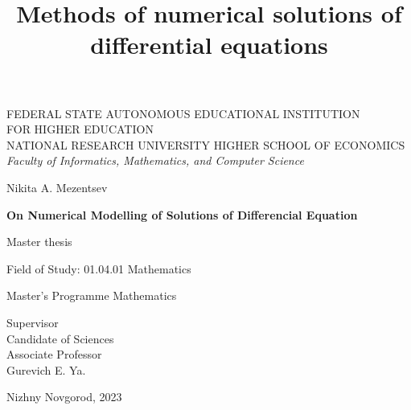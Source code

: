 \documentclass{article}
\title{Methods of numerical solutions of differential equations}
\date{}
\begin{document}
\large %
 \pagestyle{empty}
\begin{center}
{FEDERAL STATE AUTONOMOUS EDUCATIONAL INSTITUTION\\
FOR HIGHER EDUCATION\\
NATIONAL RESEARCH UNIVERSITY HIGHER SCHOOL OF ECONOMICS}\\
{\textit {Faculty of Informatics, Mathematics, and Computer Science}}\\
\end{center}
\vspace{30mm}
\begin{center}
{\Large Nikita A. Mezentsev}
\end{center}
\begin{center}
{\Large \bf On Numerical Modelling of Solutions of Differencial Equation}
\end{center}

\begin{center}
{\Large Master thesis}
\end{center}
\begin {center}
{\Large Field of Study: 01.04.01 Mathematics}
\end{center}
\begin{center}
{\Large Master's Programme Mathematics}
\end{center}

\vspace{10mm}
\begin{center}
\end{center}


\vspace{5mm}

\begin{flushright}
{\Large               Supervisor\\ Candidate of Sciences\\
Associate Professor\\ Gurevich E. Ya.}\\
\end{flushright}

\vspace{90mm}
\begin{center}
Nizhny Novgorod, 2023
\end{center}

\pagebreak

\renewcommand\contentsname{The Table of Contents} %
\sloppy
\normalfont
\tableofcontents

\pagebreak
\end{document}
